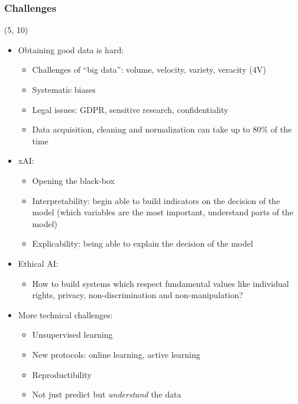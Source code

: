 \begin{frame}
  \frametitle{Challenges}

  \begin{textblock}{90}(5, 10)
    \begin{itemize}
    \item Obtaining good data is hard:
      \begin{itemize}
      \item Challenges of ``big data'': volume, velocity, variety, veracity (4V)
      \item Systematic biases
      \item Legal issues: GDPR, sensitive research, confidentiality
      \item Data acquisition, cleaning and normalization can take up to 80\% of
        the time
      \end{itemize}
    \item \acl{xAI}:
      \begin{itemize}
      \item Opening the black-box
      \item Interpretability: begin able to build indicators on the decision of the model
        (which variables are the most important, understand parts of the model)
      \item Explicability: being able to explain the decision of the model
      \end{itemize}
    \item Ethical \ac{AI}:
      \begin{itemize}
      \item How to build systems which respect fundamental values like individual rights, privacy, non-discrimination and non-manipulation?
      \end{itemize}
    \item More technical challenges:
      \begin{itemize}
      \item Unsupervised learning
      \item New protocols: online learning, active learning
      \item Reproductibility
      \item Not just predict but \emph{understand} the data
      \end{itemize}
    \end{itemize}
  \end{textblock}
\end{frame}


